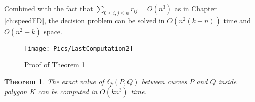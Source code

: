 \documentclass[12pt]{dalthesis}
\newtheorem{theorem}{Theorem}
\newcommand{\lee}{\leqslant}
\newcommand{\CF}{{\mathscr F}}
\newcommand{\distFS}{\delta_{\bar{F}}} \newcommand{\distWeakF}{\delta_{\bar{N}}} \newcommand{\distClosedF}{\delta_{\bar{C}}} \newcommand{\distPartialF}{\delta_{\bar{P}}} \newcommand{\distGrpahF}{\delta_{\bar{G}}} \newcommand{\distDisF}{\delta_{dF}} \newcommand{\distGeoF}{\delta_{\hat{F}}} \newcommand{\distHomF}{\delta_{h}} \newcommand{\distC}{\delta_C} \newcommand{\distSetF}{\delta_{\CF}}
\begin{document}
Combined with the fact that $\sum_{0\lee i,j \lee n} r_{ij} = O(n^3)$ as in Chapter \ref{ch:speedFD},
the decision problem can be solved in $O(n^2(k+ n))$ time and $O(n^2+ k)$ space.




\begin{figure}[t]
	\centering
	\texttt{[image: Pics/LastComputation2]}  
	\caption{Proof of Theorem \ref{thm:naivePoly}}
	\label{fig:PolyLast}
\end{figure}

\newcommand{\Funn}{\CF}


\begin{theorem} \label{thm:naivePoly}
   The exact value of $\distFS(P,Q)$ between curves $P$ and $Q$ inside polygon $K$
   can be computed in $O( kn^3)$ time.
\end{theorem}
\end{document}
